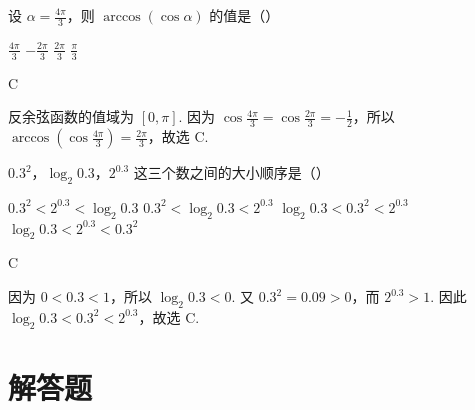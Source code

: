 \begin{problem}
设 \(\alpha = \frac{4\pi}{3}\)，则 \(\arccos\left(\cos\alpha\right)\) 的值是（\quad）

\choices
    {\(\frac{4\pi}{3}\)}
    {\(-\frac{2\pi}{3}\)}
    {\(\frac{2\pi}{3}\)}
    {\(\frac{\pi}{3}\)}

\begin{answer}
C
\end{answer}

\begin{solution}
反余弦函数的值域为 \([0,\pi]\). 因为 \(\cos\frac{4\pi}{3}=\cos\frac{2\pi}{3}=-\frac{1}{2}\)，所以 \(\arccos\left(\cos\frac{4\pi}{3}\right)=\frac{2\pi}{3}\)，故选 C.
\end{solution}
\end{problem}

\begin{problem}
\(0.3^{2}\)，\(\log_{2}0.3\)，\(2^{0.3}\) 这三个数之间的大小顺序是（\quad）

\choices
    {\(0.3^{2} < 2^{0.3} < \log_{2}0.3\)}
    {\(0.3^{2} < \log_{2}0.3 < 2^{0.3}\)}
    {\(\log_{2}0.3 < 0.3^{2} < 2^{0.3}\)}
    {\(\log_{2}0.3 < 2^{0.3} < 0.3^{2}\)}

\begin{answer}
C
\end{answer}

\begin{solution}
因为 \(0<0.3<1\)，所以 \(\log_{2}0.3<0\). 又 \(0.3^{2}=0.09>0\)，而 \(2^{0.3}>1\). 因此 \(\log_{2}0.3<0.3^{2}<2^{0.3}\)，故选 C.
\end{solution}
\end{problem}

\section{解答题}

